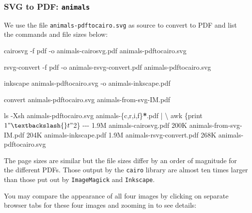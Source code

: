 \documentclass[
  a4paper,
]{article}
\newenvironment{Shaded}{\begin{snugshade}}{\end{snugshade}}
\newcommand{\AttributeTok}[1]{\textcolor[rgb]{0.80,0.80,0.80}{#1}}
\newcommand{\DataTypeTok}[1]{\textcolor[rgb]{0.87,0.87,0.75}{#1}}
\newcommand{\ExtensionTok}[1]{\textcolor[rgb]{0.80,0.80,0.80}{#1}}
\newcommand{\FunctionTok}[1]{\textcolor[rgb]{0.94,0.94,0.56}{#1}}
\newcommand{\KeywordTok}[1]{\textcolor[rgb]{0.94,0.87,0.69}{#1}}
\newcommand{\NormalTok}[1]{\textcolor[rgb]{0.80,0.80,0.80}{#1}}
\newcommand{\OperatorTok}[1]{\textcolor[rgb]{0.94,0.94,0.82}{#1}}
\newcommand{\PreprocessorTok}[1]{\textcolor[rgb]{1.00,0.81,0.69}{\textbf{#1}}}
\newcommand{\StringTok}[1]{\textcolor[rgb]{0.80,0.58,0.58}{#1}}
\begin{document}
\hypertarget{svg-to-pdf-animals}{%
\subsubsection{\texorpdfstring{SVG to PDF:
\texttt{animals}}{SVG to PDF: animals}}\label{svg-to-pdf-animals}}

We use the file \texttt{animals-pdftocairo.svg} as source to convert to
PDF and list the commands and file sizes below:

\begin{Shaded}
\begin{Highlighting}[]
\ExtensionTok{cairosvg} \AttributeTok{{-}f}\NormalTok{ pdf }\AttributeTok{{-}o}\NormalTok{ animals{-}cairosvg.pdf animals{-}pdftocairo.svg}

\ExtensionTok{rsvg{-}convert} \AttributeTok{{-}f}\NormalTok{ pdf }\AttributeTok{{-}o}\NormalTok{ animals{-}rsvg{-}convert.pdf animals{-}pdftocairo.svg}

\ExtensionTok{inkscape}\NormalTok{ animals{-}pdftocairo.svg }\AttributeTok{{-}o}\NormalTok{ animals{-}inkscape.pdf}

\ExtensionTok{convert}\NormalTok{ animals{-}pdftocairo.svg animals{-}from{-}svg{-}IM.pdf}

\FunctionTok{ls} \AttributeTok{{-}Xsh}\NormalTok{ animals{-}pdftocairo.svg animals{-}}\DataTypeTok{\{c}\OperatorTok{,}\DataTypeTok{r}\OperatorTok{,}\DataTypeTok{i}\OperatorTok{,}\DataTypeTok{f\}}\PreprocessorTok{*}\NormalTok{.pdf }\KeywordTok{|} \DataTypeTok{\textbackslash{}}
\FunctionTok{awk} \StringTok{\textquotesingle{}\{print $1 "\textbackslash{}t" $2\}\textquotesingle{}}
\ExtensionTok{{-}{-}{-}}
\ExtensionTok{1.9M}\NormalTok{    animals{-}cairosvg.pdf}
\ExtensionTok{200K}\NormalTok{    animals{-}from{-}svg{-}IM.pdf}
\ExtensionTok{204K}\NormalTok{    animals{-}inkscape.pdf}
\ExtensionTok{1.9M}\NormalTok{    animals{-}rsvg{-}convert.pdf}
\ExtensionTok{268K}\NormalTok{    animals{-}pdftocairo.svg}
\end{Highlighting}
\end{Shaded}

The page sizes are similar but the file sizes differ by an order of
magnitude for the different PDFs. Those output by the \texttt{cairo}
library are almost ten times larger than those put out by
\texttt{ImageMagick} and \texttt{Inkscape}.

You may compare the appearance of all four images by clicking on
separate browser tabs for these four images and zooming in to see
details:
\end{document}
